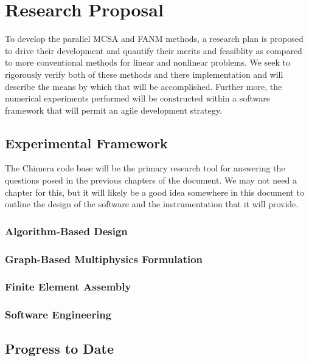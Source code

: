 \chapter{Research Proposal}
\label{ch:research_proposal}
To develop the parallel MCSA and FANM methods, a research plan is
proposed to drive their development and quantify their merits and
feasiblity as compared to more conventional methods for linear and
nonlinear problems. We seek to rigorously verify both of these methods
and there implementation and will describe the means by which that
will be accomplished. Further more, the numerical experiments
performed will be constructed within a software framework that will
permit an agile development strategy.

\section{Experimental Framework}
\label{sec:experimental_framework}

The Chimera code base will be the primary research tool for answering
the questions posed in the previous chapters of the document. We may
not need a chapter for this, but it will likely be a good idea
somewhere in this document to outline the design of the software and
the instrumentation that it will provide.

\subsection{Algorithm-Based Design}
\label{subsec:chimera_design}

\subsection{Graph-Based Multiphysics Formulation}
\label{subsec:multiphysics_graph}

\subsection{Finite Element Assembly}
\label{subsec:fem_assembly}

\subsection{Software Engineering}
\label{subsec:software_engineering}

\section{Progress to Date}
\label{sec:progress}

